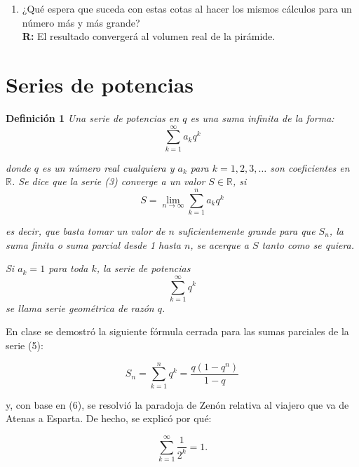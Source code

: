 \documentclass[12pt]{article}
\begin{document}
\begin{enumerate}
    \item ¿Qué espera que suceda con estas cotas al hacer los mismos cálculos para un número más y más grande?\\
     {\bf R:} El resultado convergerá al volumen real de la pirámide. 
   \end{enumerate}


\section{Series de potencias}

    {\bf Definición 1} \textit{Una serie de potencias en $q$ es una suma infinita de la forma:}\[\sum_{k=1}^{\infty} a_k q^k \tag{3}\]

    \textit{donde $q$ es un número real cualquiera y $a_k$ para $k = 1, 2, 3, \dots$ son coeficientes en $\mathbb{R}$. Se dice que la serie (3) converge a un valor $S \in \mathbb{R}$, si}\[S = \lim_{n \to \infty} \sum_{k=1}^{n} a_k q^k \tag{4}\]


    \textit{es decir, que basta tomar un valor de $n$ suficientemente grande para que $S_n$, la suma finita o suma parcial desde 1 hasta $n$, se acerque a $S$ tanto como se quiera.}

    \textit{Si $a_k = 1$ para toda $k$, la serie de potencias}
    \[\sum_{k=1}^{\infty} q^k \tag{5}\]
    \textit{se llama serie geométrica de razón $q$.}


    En clase se demostró la siguiente fórmula cerrada para las sumas parciales de la serie (5):

    \[S_n = \sum_{k=1}^{n} q^k = \frac{q (1 - q^n)}{1 - q} \tag{6}\]

    y, con base en (6), se resolvió la paradoja de Zenón relativa al viajero que va de Atenas a Esparta. De hecho, se explicó por qué:

    \[\sum_{k=1}^{\infty} \frac{1}{2^k} = 1.\]
\end{document}
